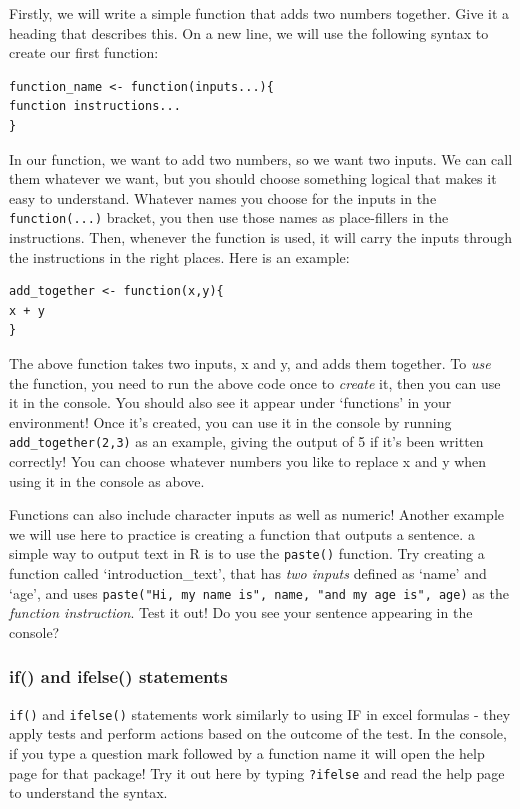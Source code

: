 \documentclass[
  12pt,
]{article}
\begin{document}
Firstly, we will write a simple function that adds two numbers together.
Give it a heading that describes this. On a new line, we will use the
following syntax to create our first function:

\begin{verbatim}
function_name <- function(inputs...){
function instructions...
}
\end{verbatim}

In our function, we want to add two numbers, so we want two inputs. We
can call them whatever we want, but you should choose something logical
that makes it easy to understand. Whatever names you choose for the
inputs in the \texttt{function(...)} bracket, you then use those names
as place-fillers in the instructions. Then, whenever the function is
used, it will carry the inputs through the instructions in the right
places. Here is an example:

\begin{verbatim}
add_together <- function(x,y){
x + y
}
\end{verbatim}

The above function takes two inputs, x and y, and adds them together. To
\emph{use} the function, you need to run the above code once to
\emph{create} it, then you can use it in the console. You should also
see it appear under `functions' in your environment! Once it's created,
you can use it in the console by running \texttt{add\_together(2,3)} as
an example, giving the output of 5 if it's been written correctly! You
can choose whatever numbers you like to replace x and y when using it in
the console as above.

Functions can also include character inputs as well as numeric! Another
example we will use here to practice is creating a function that outputs
a sentence. a simple way to output text in R is to use the
\texttt{paste()} function. Try creating a function called
`introduction\_text', that has \emph{two inputs} defined as `name' and
`age', and uses
\texttt{paste("Hi,\ my\ name\ is",\ name,\ "and\ my\ age\ is",\ age)} as
the \emph{function instruction}. Test it out! Do you see your sentence
appearing in the console?

\hypertarget{if-and-ifelse-statements}{%
\subsubsection{if() and ifelse()
statements}\label{if-and-ifelse-statements}}

\texttt{if()} and \texttt{ifelse()} statements work similarly to using
IF in excel formulas - they apply tests and perform actions based on the
outcome of the test. In the console, if you type a question mark
followed by a function name it will open the help page for that package!
Try it out here by typing \texttt{?ifelse} and read the help page to
understand the syntax.
\end{document}
